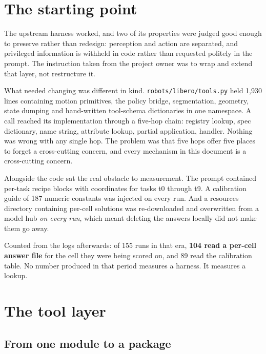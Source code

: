 \documentclass[11pt,a4paper]{report}
\begin{document}
\chapter{The starting point}

The upstream harness worked, and two of its properties were judged good enough
to preserve rather than redesign: perception and action are separated, and
privileged information is withheld in code rather than requested politely in the
prompt. The instruction taken from the project owner was to wrap and extend that
layer, not restructure it.

What needed changing was different in kind. \texttt{robots/libero/tools.py} held
1{,}930 lines containing motion primitives, the policy bridge, segmentation,
geometry, state dumping and hand-written tool-schema dictionaries in one
namespace. A call reached its implementation through a five-hop chain: registry
lookup, spec dictionary, name string, attribute lookup, partial application,
handler. Nothing was wrong with any single hop. The problem was that five hops
offer five places to forget a cross-cutting concern, and every mechanism in this
document is a cross-cutting concern.

Alongside the code sat the real obstacle to measurement. The prompt contained
per-task recipe blocks with coordinates for tasks t0 through t9. A calibration
guide of 187 numeric constants was injected on every run. And a resources
directory containing per-cell solutions was re-downloaded and overwritten from a
model hub \emph{on every run}, which meant deleting the answers locally did not
make them go away.

\begin{caution}[title={The measurement this made impossible}]
Counted from the logs afterwards: of 155 runs in that era, \textbf{104 read a
per-cell answer file} for the cell they were being scored on, and 89 read the
calibration table. No number produced in that period measures a harness. It
measures a lookup.
\end{caution}

\chapter{The tool layer}

\section{From one module to a package}
\end{document}
